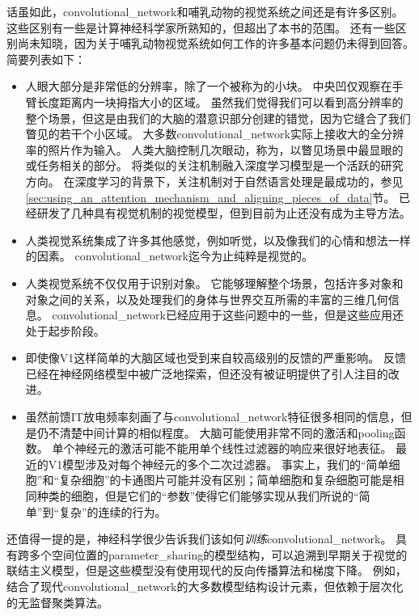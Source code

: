 话虽如此，\gls{convolutional_network}和哺乳动物的视觉系统之间还是有许多区别。
这些区别有一些是计算神经科学家所熟知的，但超出了本书的范围。
还有一些区别尚未知晓，因为关于哺乳动物视觉系统如何工作的许多基本问题仍未得到回答。
简要列表如下：
\begin{itemize}
  \item 人眼大部分是非常低的分辨率，除了一个被称为的小块。
  中央凹仅观察在手臂长度距离内一块拇指大小的区域。
  虽然我们觉得我们可以看到高分辨率的整个场景，但这是由我们的大脑的潜意识部分创建的错觉，因为它缝合了我们瞥见的若干个小区域。
  大多数\gls{convolutional_network}实际上接收大的全分辨率的照片作为输入。
  人类大脑控制几次眼动，称为，以瞥见场景中最显眼的或任务相关的部分。
  将类似的关注机制融入深度学习模型是一个活跃的研究方向。
  在深度学习的背景下，关注机制对于自然语言处理是最成功的，参见\ref{sec:using_an_attention_mechanism_and_aligning_pieces_of_data}节。
  已经研发了几种具有视觉机制的视觉模型，但到目前为止还没有成为主导方法\citep{Larochelle2010,Denil2012}。
  
  \item 人类视觉系统集成了许多其他感觉，例如听觉，以及像我们的心情和想法一样的因素。
  \gls{convolutional_network}迄今为止纯粹是视觉的。
  
  \item 人类视觉系统不仅仅用于识别对象。
  它能够理解整个场景，包括许多对象和对象之间的关系，以及处理我们的身体与世界交互所需的丰富的三维几何信息。
  \gls{convolutional_network}已经应用于这些问题中的一些，但是这些应用还处于起步阶段。
  
  \item 即使像V1这样简单的大脑区域也受到来自较高级别的反馈的严重影响。
  反馈已经在神经网络模型中被广泛地探索，但还没有被证明提供了引人注目的改进。
  
  \item 虽然前馈IT放电频率刻画了与\gls{convolutional_network}特征很多相同的信息，但是仍不清楚中间计算的相似程度。
  大脑可能使用非常不同的激活和\gls{pooling}函数。
  单个神经元的激活可能不能用单个线性过滤器的响应来很好地表征。
  最近的V1模型涉及对每个神经元的多个二次过滤器\citep{rust:2005}。
  事实上，我们的``简单细胞''和``复杂细胞''的卡通图片可能并没有区别；简单细胞和复杂细胞可能是相同种类的细胞，但是它们的``参数''使得它们能够实现从我们所说的``简单''到``复杂''的连续的行为。
\end{itemize}
 
 
还值得一提的是，神经科学很少告诉我们该如何\emph{训练}\gls{convolutional_network}。
具有跨多个空间位置的\gls{parameter_sharing}的模型结构，可以追溯到早期关于视觉的联结主义模型\citep{Marr76}，但是这些模型没有使用现代的反向传播算法和梯度下降。
例如，\citep{Fukushima80}结合了现代\gls{convolutional_network}的大多数模型结构设计元素，但依赖于层次化的无监督聚类算法。

